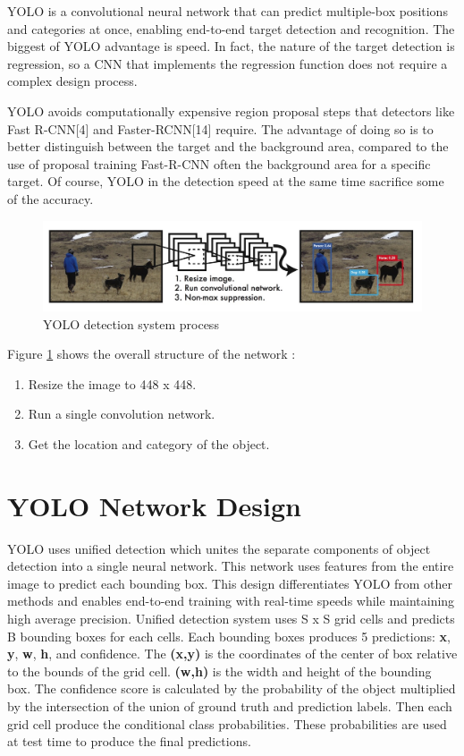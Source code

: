 YOLO is a convolutional neural network that can predict multiple-box positions and categories at once, enabling end-to-end target detection and recognition. The biggest of YOLO advantage is speed. In fact, the nature of the target detection is regression, so a CNN that implements the regression function does not require a complex design process.

YOLO avoids computationally expensive region proposal steps that detectors like Fast R-CNN[4] and Faster-RCNN[14] require. The advantage of doing so is to better distinguish between the target and the background area, compared to the use of proposal training Fast-R-CNN often the background area for a specific target. Of course, YOLO in the detection speed at the same time sacrifice some of the accuracy. 

\begin{figure}[h]
\centering
\includegraphics[scale=0.35]{figures/yolo_working.jpg}
\caption{YOLO detection system process}
\label{yolo_working}
\end{figure}

Figure \ref{yolo_working} shows the overall structure of the network :

\begin{enumerate}
\setlength{\itemsep}{-10pt}
\item Resize the image to 448 x 448.
\item Run a single convolution network.
\item Get the location and category of the object.
\end{enumerate}

\section{YOLO Network Design}

YOLO uses unified detection which unites the separate components of object detection into a single neural network. This network uses features from the entire image to predict each bounding box. This design differentiates YOLO from other methods and enables end-to-end training with real-time speeds while maintaining high average precision.  Unified detection system uses S x S grid cells and predicts B bounding boxes for each cells. Each bounding boxes produces 5 predictions: \textbf{ x},\textbf{ y}, \textbf{w}, \textbf{ h}, and confidence. The \textbf{(x,y)} is the coordinates of the center of box relative to the bounds of the grid cell. \textbf{(w,h)} is the width and height of the bounding box. The confidence score is calculated by the probability of the object multiplied by the intersection of the union of ground truth and prediction labels. Then each grid cell produce the conditional class probabilities. These probabilities are used at test time to produce the final predictions.

